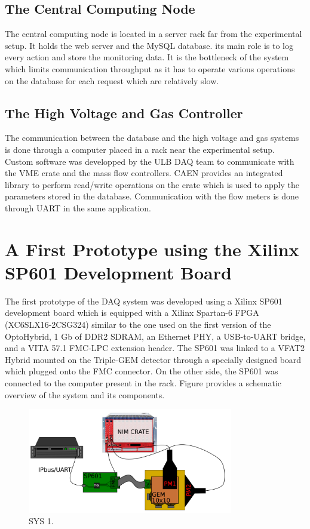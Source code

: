     \subsection{The Central Computing Node}

      The central computing node is located in a server rack far from the experimental setup. It holds the web server and the MySQL database. its main role is to log every action and store the monitoring data. It is the bottleneck of the system which limits communication throughput as it has to operate various operations on the database for each request which are relatively slow.

    \subsection{The High Voltage and Gas Controller}

      The communication between the database and the high voltage and gas systems is done through a computer placed in a rack near the experimental setup. Custom software was developped by the ULB DAQ team to communicate with the VME crate and the mass flow controllers. CAEN provides an integrated library to perform read/write operations on the crate which is used to apply the parameters stored in the database. Communication with the flow meters is done through UART in the same application.

  \section{A First Prototype using the Xilinx SP601 Development Board}

    The first prototype of the DAQ system was developed using a Xilinx SP601 development board which is equipped with a Xilinx Spartan-6 FPGA (XC6SLX16-2CSG324) similar to the one used on the first version of the OptoHybrid, 1 Gb of DDR2 SDRAM, an Ethernet PHY, a USB-to-UART bridge, and a VITA 57.1 FMC-LPC extension header. The SP601 was linked to a VFAT2 Hybrid mounted on the Triple-GEM detector through a specially designed board which plugged onto the FMC connector. On the other side, the SP601 was connected to the computer present in the rack. Figure \label{fig:III-1-sys-1} provides a schematic overview of the system and its components.

    \begin{figure}[h!]
      \centering
      \includegraphics[width=0.8\textwidth]{img/III-1-arch/sys_1.png}
      \caption{SYS 1.}
      \label{fig:III-1-sys-1}
    \end{figure}

